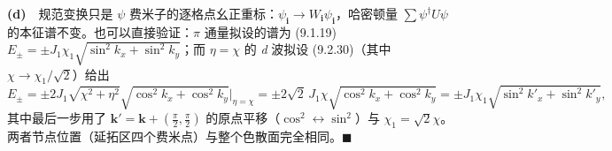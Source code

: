 \textbf{(d)}　规范变换只是 $\psi$ 费米子的逐格点幺正重标：$\psi_{\pmb{i}}\to W_{\pmb{i}}\psi_{\pmb{i}}$，哈密顿量 $\sum\psi^{\dagger}U\psi$ 的本征谱不变。也可以直接验证：$\pi$ 通量拟设的谱为 (9.1.19) $E_{\pm}=\pm J_1\chi_1\sqrt{\sin^2k_x+\sin^2k_y}$；而 $\eta=\chi$ 的 \emph{d} 波拟设 (9.2.30)（其中 $\chi\to\chi_1/\sqrt2$）给出
\begin{equation*}
E_{\pm}=\pm2J_1\sqrt{\chi^{2}+\eta^{2}}\sqrt{\cos^{2}k_x+\cos^{2}k_y}\big|_{\eta=\chi}
=\pm2\sqrt2\,J_1\chi\sqrt{\cos^{2}k_x+\cos^{2}k_y}
=\pm J_1\chi_1\sqrt{\sin^{2}k'_x+\sin^{2}k'_y} ,
\end{equation*}
其中最后一步用了 $\pmb{k}'=\pmb{k}+(\frac{\pi}{2},\frac{\pi}{2})$ 的原点平移（$\cos^2\leftrightarrow\sin^2$）与 $\chi_1=\sqrt2\chi$。两者节点位置（延拓区四个费米点）与整个色散面完全相同。$\blacksquare$


